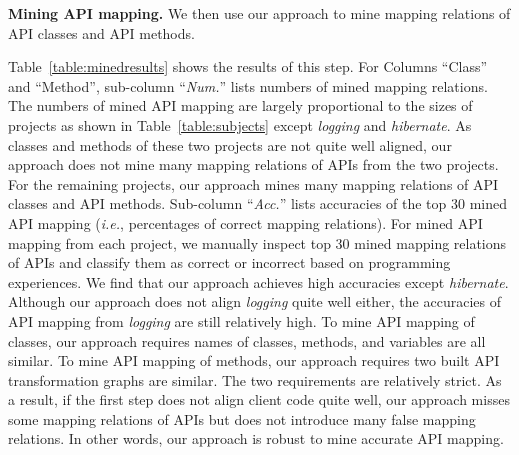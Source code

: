 \textbf{Mining API mapping.} We then use our approach to mine
mapping relations of API classes and API methods.

Table~\ref{table:minedresults} shows the results of this step. For
Columns ``Class'' and ``Method'', sub-column ``\emph{Num.}'' lists
numbers of mined mapping relations. The numbers of mined API mapping
are largely proportional to the sizes of projects as shown in
Table~\ref{table:subjects} except \emph{logging} and
\emph{hibernate}. As classes and methods of these two projects are
not quite well aligned, our approach does not mine many mapping
relations of APIs from the two projects. For the remaining projects,
our approach mines many mapping relations of API classes and API
methods. Sub-column ``\emph{Acc.}'' lists accuracies of the top 30
mined API mapping (\emph{i.e.}, percentages of correct mapping
relations). For mined API mapping from each project, we manually
inspect top 30 mined mapping relations of APIs and classify them as
correct or incorrect based on programming experiences. We find that
our approach achieves high accuracies except \emph{hibernate}.
Although our approach does not align \emph{logging} quite well
either, the accuracies of API mapping from \emph{logging} are still
relatively high. To mine API mapping of classes, our approach
requires names of classes, methods, and variables are all similar.
To mine API mapping of methods, our approach requires two built API
transformation graphs are similar. The two requirements are
relatively strict. As a result, if the first step does not align
client code quite well, our approach misses some mapping relations
of APIs but does not introduce many false mapping relations. In
other words, our approach is robust to mine accurate API mapping.




